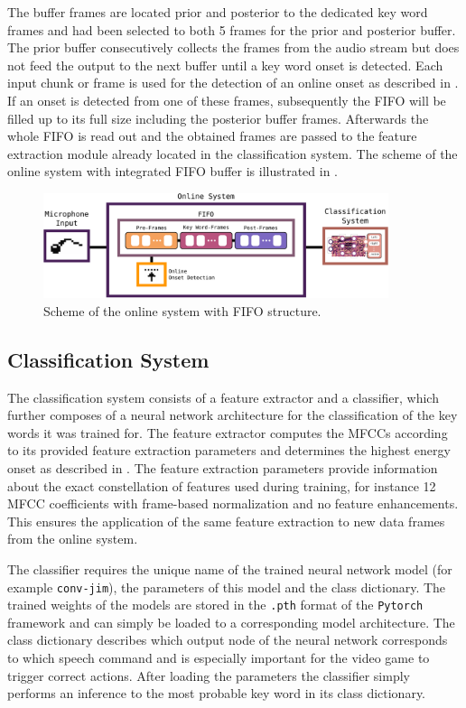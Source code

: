 The buffer frames are located prior and posterior to the dedicated key word frames and had been selected to both 5 frames for the prior and posterior buffer.
The prior buffer consecutively collects the frames from the audio stream but does not feed the output to the next buffer until a key word onset is detected. 
Each input chunk or frame is used for the detection of an online onset as described in .
If an onset is detected from one of these frames, subsequently the FIFO will be filled up to its full size including the posterior buffer frames.
Afterwards the whole FIFO is read out and the obtained frames are passed to the feature extraction module already located in the classification system.
The scheme of the online system with integrated FIFO buffer is illustrated in .
\begin{figure}[!ht]
  \centering
  \includegraphics[width=0.9\textwidth]{./6_game/figs/game_system_online.pdf}
  \caption{Scheme of the online system with FIFO structure.}
  \label{fig:game_system_online}
\end{figure}
\FloatBarrier
\noindent



\subsection{Classification System}
The classification system consists of a feature extractor and a classifier, which further composes of a neural network architecture for the classification of the key words it was trained for.
The feature extractor computes the MFCCs according to its provided feature extraction parameters and determines the highest energy onset as described in .
The feature extraction parameters provide information about the exact constellation of features used during training, for instance 12 MFCC coefficients with frame-based normalization and no feature enhancements.
This ensures the application of the same feature extraction to new data frames from the online system.

The classifier requires the unique name of the trained neural network model (for example \texttt{conv-jim}), the parameters of this model and the class dictionary.
The trained weights of the  models are stored in the \texttt{.pth} format of the \texttt{Pytorch} framework and can simply be loaded to a corresponding model architecture.
The class dictionary describes which output node of the neural network corresponds to which speech command and is especially important for the video game to trigger correct actions.
After loading the parameters the classifier simply performs an inference to the most probable key word in its class dictionary.

